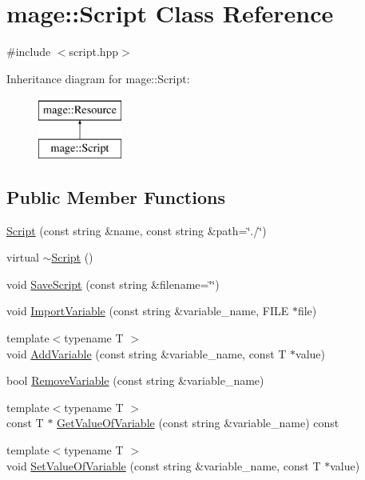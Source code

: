 \hypertarget{classmage_1_1_script}{}\section{mage\+:\+:Script Class Reference}
\label{classmage_1_1_script}


{\ttfamily \#include $<$script.\+hpp$>$}

Inheritance diagram for mage\+:\+:Script\+:\begin{figure}[H]
\begin{center}
\leavevmode
\includegraphics[height=2.000000cm]{classmage_1_1_script}
\end{center}
\end{figure}
\subsection*{Public Member Functions}
\begin{DoxyCompactItemize}
\item 
\hyperlink{classmage_1_1_script_aa82d3299c964e29ad23b41de3e26c511}{Script} (const string \&name, const string \&path=\char`\"{}./\char`\"{})
\item 
virtual \hyperlink{classmage_1_1_script_a5ac07d9382cc28d5441e4fe6a9ca32e4}{$\sim$\+Script} ()
\item 
void \hyperlink{classmage_1_1_script_a4b6ff9e33d49d58c0d6bfaa189542a64}{Save\+Script} (const string \&filename=\char`\"{}\char`\"{})
\item 
void \hyperlink{classmage_1_1_script_a831948e158eb3ee9f0bc5175cad89912}{Import\+Variable} (const string \&variable\+\_\+name, F\+I\+LE $\ast$file)
\item 
{\footnotesize template$<$typename T $>$ }\\void \hyperlink{classmage_1_1_script_ae8df115d6c2d44dc65c840d0cade7573}{Add\+Variable} (const string \&variable\+\_\+name, const T $\ast$value)
\item 
bool \hyperlink{classmage_1_1_script_ae1c57c3cbfe451dc22a018a31ba7670d}{Remove\+Variable} (const string \&variable\+\_\+name)
\item 
{\footnotesize template$<$typename T $>$ }\\const T $\ast$ \hyperlink{classmage_1_1_script_a7cac6a8798ea0d0117396d94ff556820}{Get\+Value\+Of\+Variable} (const string \&variable\+\_\+name) const
\item 
{\footnotesize template$<$typename T $>$ }\\void \hyperlink{classmage_1_1_script_a27b5dc3d43c961fa590665d5b072f37a}{Set\+Value\+Of\+Variable} (const string \&variable\+\_\+name, const T $\ast$value)
\end{DoxyCompactItemize}
